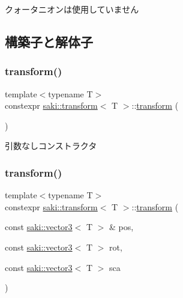 クォータニオンは使用していません 

\subsection{構築子と解体子}
\mbox{\label{classsaki_1_1transform_a6d3d745d729424d11a67514dcbedfc4b}} 
\subsubsection{\texorpdfstring{transform()}{transform()}\hspace{0.1cm}{\footnotesize\ttfamily [1/4]}}
{\footnotesize\ttfamily template$<$typename T$>$ \\
constexpr \mbox{\hyperlink{classsaki_1_1transform}{saki\+::transform}}$<$ T $>$\+::\mbox{\hyperlink{classsaki_1_1transform}{transform}} (\begin{DoxyParamCaption}{ }\end{DoxyParamCaption})\hspace{0.3cm}{\ttfamily [inline]}}



引数なしコンストラクタ 

\mbox{\label{classsaki_1_1transform_ae508c65cf86017bc6deae19eda294dbf}} 
\subsubsection{\texorpdfstring{transform()}{transform()}\hspace{0.1cm}{\footnotesize\ttfamily [2/4]}}
{\footnotesize\ttfamily template$<$typename T$>$ \\
constexpr \mbox{\hyperlink{classsaki_1_1transform}{saki\+::transform}}$<$ T $>$\+::\mbox{\hyperlink{classsaki_1_1transform}{transform}} (\begin{DoxyParamCaption}\item[{const \mbox{\hyperlink{classsaki_1_1vector3}{saki\+::vector3}}$<$ T $>$ \&}]{pos,  }\item[{const \mbox{\hyperlink{classsaki_1_1vector3}{saki\+::vector3}}$<$ T $>$}]{rot,  }\item[{const \mbox{\hyperlink{classsaki_1_1vector3}{saki\+::vector3}}$<$ T $>$}]{sca }\end{DoxyParamCaption})\hspace{0.3cm}{\ttfamily [inline]}}



